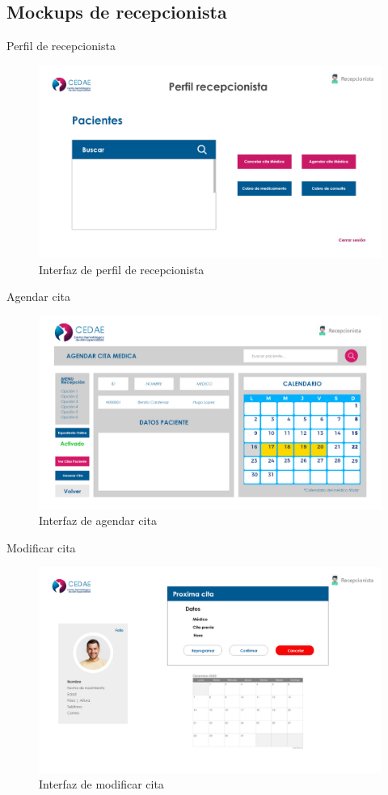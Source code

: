 \documentclass[12pt,letterpaper]{article}
\begin{document}
        \subsection{Mockups de recepcionista}
        Perfil de recepcionista
            \begin{figure}[H]
                \centering
                \includegraphics [scale=0.19]{rec_perfil}
                \caption{Interfaz de perfil de recepcionista}
            \end{figure}
        Agendar cita
            \begin{figure}[H]
                \centering
                \includegraphics [scale=0.18]{rec_agendar_cita}
                \caption{Interfaz de agendar cita}
            \end{figure}
        Modificar cita
            \begin{figure}[H]
                \centering
                \includegraphics [scale=0.18]{rec_modificar_cita}
                \caption{Interfaz de modificar cita}
            \end{figure}
\end{document}
